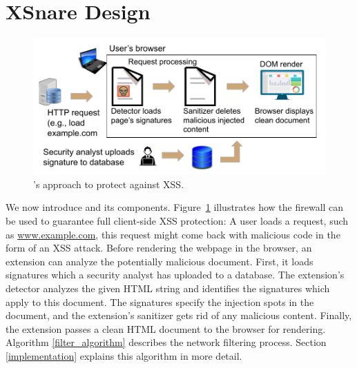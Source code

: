 \section{XSnare Design} \label{xsnare_design}

 \begin{figure}[h]
	\includegraphics[scale=0.55]{img/xsnare.pdf}
	\caption{\sys's approach to protect against XSS.}
	\label{fig:xsnare}
\end{figure}

We now introduce \sys and its components. %
%
%
Figure~\ref{fig:xsnare} illustrates how the firewall can be used to
guarantee full client-side XSS protection: A user loads a request,
such as \url{www.example.com}, this request might come back with
malicious code in the form of an XSS attack. Before rendering the
webpage in the browser, an extension can analyze the potentially
malicious document. First, it loads signatures which a security
analyst
has uploaded to a database. The extension's detector analyzes the
given HTML string and identifies the signatures which apply to this
document. The signatures specify the injection spots in the document,
and the extension's sanitizer gets rid of any malicious
content. Finally, the extension passes a clean HTML document to the
browser for rendering. Algorithm \ref{filter_algorithm} describes the
network filtering process. Section \ref{implementation} explains this
algorithm in more detail.
 

